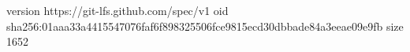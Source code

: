 version https://git-lfs.github.com/spec/v1
oid sha256:01aaa33a4415547076faf6f898325506fce9815ecd30dbbade84a3eeae09e9fb
size 1652
